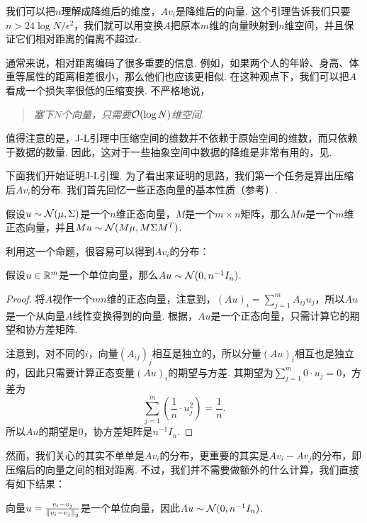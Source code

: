 我们可以把$n$理解成降维后的维度，$Av_i$是降维后的向量. 这个引理告诉我们只要$n > 24\log N/\epsilon^2$，我们就可以用变换$A$把原本$m$维的向量映射到$n$维空间，并且保证它们相对距离的偏离不超过$\epsilon$.

通常来说，相对距离编码了很多重要的信息. 例如，如果两个人的年龄、身高、体重等属性的距离相差很小，那么他们也应该更相似. 在这种观点下，我们可以把$A$看成一个损失率很低的压缩变换. 不严格地说，
\begin{quotation}
    \textit{塞下$N$个向量，只需要$\mathcal{O}(\log N)$维空间.}
\end{quotation}

值得注意的是，J-L引理中压缩空间的维数并不依赖于原始空间的维数，而只依赖于数据的数量. 因此，这对于一些抽象空间中数据的降维是非常有用的，见.

下面我们开始证明J-L引理. 为了看出来证明的思路，我们第一个任务是算出压缩后$Av_i$的分布. 我们首先回忆一些正态向量的基本性质（参考）. 

\begin{proposition}\label{proposition:gaussian-vector}
假设$u\sim\mathcal{N}(\mu,\Sigma)$是一个$n$维正态向量，$M$是一个$m\times n$矩阵，那么$Mu$是一个$m$维正态向量，并且$Mu\sim \mathcal{N}(M\mu,M\Sigma M^T)$.
\end{proposition}

利用这一个命题，很容易可以得到$Av_i$的分布：

\begin{lemma}\label{lemma:gaussian-vector}
    假设$u\in\mathbb{R}^m$是一个单位向量，那么$Au\sim \mathcal{N}(0,n^{-1}I_n)$.
\end{lemma}
\begin{proof}
    将$A$视作一个$mn$维的正态向量，注意到，$(Au)_i = \sum_{j=1}^m A_{ij}u_j$，所以$Au$是一个从向量$A$线性变换得到的向量. 根据，$Au$是一个正态向量，只需计算它的期望和协方差矩阵. 
   
   注意到，对不同的$i$，向量$(A_{ij})_{j}$相互是独立的，所以分量$(Au)_i$相互也是独立的，因此只需要计算正态变量$(Au)_i$的期望与方差. 其期望为$\sum_{j=1}^m 0\cdot u_j = 0$，方差为
   \[\sum_{j=1}^m \left(\frac{1}{n}\cdot u_j^2\right) = \frac{1}{n}.\] 
   所以$Au$的期望是$0$，协方差矩阵是$n^{-1}I_n$.
\end{proof}

然而，我们关心的其实不单单是$Av_i$的分布，更重要的其实是$Av_i-Av_j$的分布，即压缩后的向量之间的相对距离. 不过，我们并不需要做额外的什么计算，我们直接有如下结果：

\begin{lemma}\label{lemma:gaussian-vector-diff}
    向量$u=\frac{v_i-v_j}{\left\|v_i-v_j\right\|_2}$是一个单位向量，因此$Au\sim \mathcal{N}(0,n^{-1}I_n)$.
\end{lemma}

